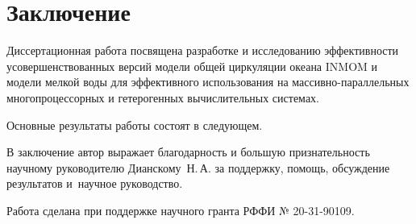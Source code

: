 \chapter*{Заключение}                       %


Диссертационная работа посвящена разработке и исследованию эффективности усовершенствованных версий модели общей циркуляции океана INMOM и модели мелкой воды для эффективного использования на массивно-параллельных многопроцессорных и гетерогенных вычислительных системах.

Основные результаты работы состоят в следующем.


В заключение автор выражает благодарность и большую признательность научному руководителю Дианскому~Н.\,А. за поддержку, помощь, обсуждение результатов и~научное руководство.

Работа сделана при поддержке научного гранта РФФИ № 20-31-90109.
